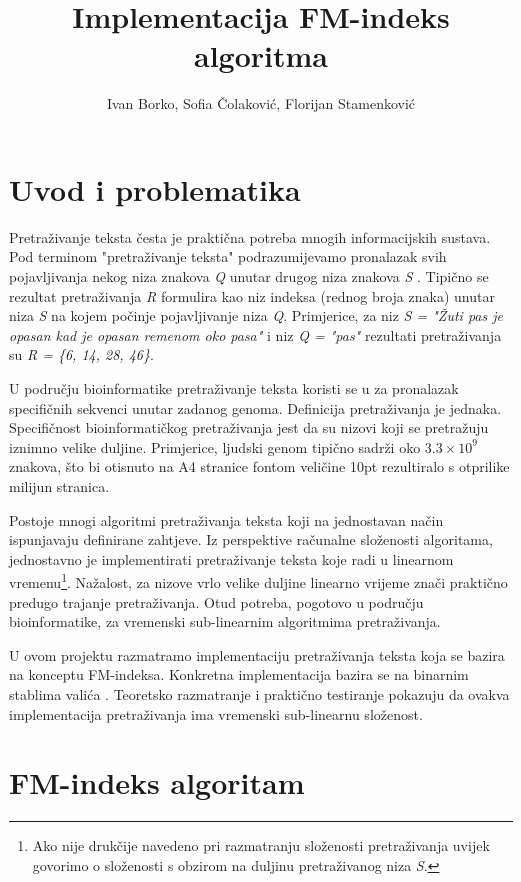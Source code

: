 \documentclass[times, utf8, seminar, numeric]{fer}
\title{Implementacija FM-indeks algoritma}
\author{Ivan Borko, Sofia Čolaković, Florijan Stamenković}
\begin{document}
\maketitle

\tableofcontents

\chapter{Uvod i problematika}

Pretraživanje teksta česta je praktična potreba mnogih informacijskih sustava.
Pod terminom "pretraživanje teksta" podrazumijevamo pronalazak svih pojavljivanja
nekog niza znakova \textit{Q}  unutar drugog niza znakova \textit{S} .
Tipično se rezultat pretraživanja \textit{R}
formulira kao niz indeksa (rednog broja znaka) unutar niza \textit{S} na kojem počinje pojavljivanje
niza \textit{Q}. Primjerice, za niz \textit{S = "Žuti pas je opasan kad je opasan remenom oko pasa"}
i niz \textit{Q = "pas"} rezultati
pretraživanja su \textit{R = \{6, 14, 28, 46\}}.

U području bioinformatike pretraživanje teksta koristi se u za pronalazak
specifičnih sekvenci unutar zadanog genoma. Definicija pretraživanja je jednaka. Specifičnost
bioinformatičkog pretraživanja jest da su nizovi koji se pretražuju iznimno velike duljine.
Primjerice, ljudski genom tipično sadrži oko $3.3 \times 10^9$ znakova, što bi otisnuto na
A4 stranice fontom veličine 10pt rezultiralo s otprilike milijun stranica.

Postoje mnogi algoritmi pretraživanja teksta
koji na jednostavan način ispunjavaju definirane zahtjeve.
Iz perspektive računalne složenosti algoritama, jednostavno je implementirati pretraživanje
teksta koje radi u linearnom vremenu\footnote{Ako nije drukčije navedeno pri razmatranju složenosti pretraživanja
uvijek govorimo o složenosti s obzirom na duljinu pretraživanog niza \textit{S}.}.
Nažalost, za nizove vrlo velike duljine linearno vrijeme
znači praktično predugo trajanje pretraživanja. Otud potreba, pogotovo u području bioinformatike,
za vremenski sub-linearnim algoritmima pretraživanja.

U ovom projektu razmatramo implementaciju pretraživanja teksta koja se bazira na konceptu
FM-indeksa. Konkretna implementacija bazira se na binarnim stablima valića .
Teoretsko razmatranje i praktično testiranje pokazuju da ovakva implementacija pretraživanja
ima vremenski sub-linearnu složenost.

\chapter{FM-indeks algoritam}
\end{document}
